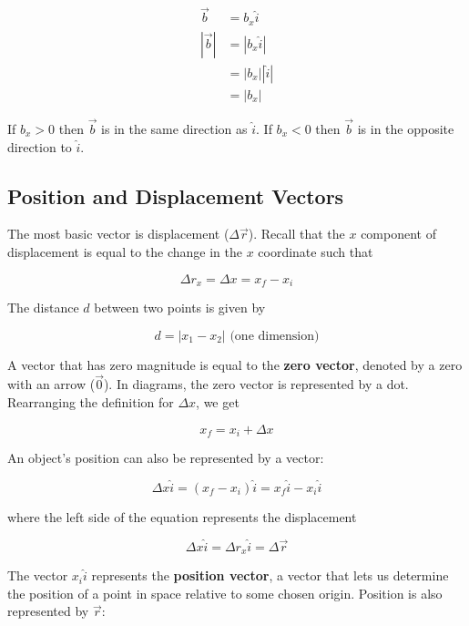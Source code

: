         \begin{align*}
            \overrightarrow{b}      &= b_x \hat{i} \\
            |\overrightarrow{b}|    &= |b_x \hat{i}| \\
                                    &= |b_x||\hat{i}| \\
                                    &= |b_x|
        \end{align*}

        \noindent If $b_x > 0$ then $\overrightarrow{b}$ is in the same direction as $\hat{i}$. If $b_x < 0$ then $\overrightarrow{b}$ is in the opposite direction to $\hat{i}$.



    \subsection{Position and Displacement Vectors}
        The most basic vector is displacement ($\Delta \overrightarrow{r}$). Recall that the $x$ component of displacement is equal to the change in the $x$ coordinate such that

        \[
            \Delta r_x = \Delta x = x_f - x_i
        \]

        \noindent The distance $d$ between two points is given by

        \[
            d = |x_1 - x_2 | \text{ (one dimension)}
        \]

        \noindent A vector that has zero magnitude is equal to the \textbf{zero vector}, denoted by a zero with an arrow ($\overrightarrow{0}$). In diagrams, the zero vector is represented by a dot. Rearranging the
        definition for $\Delta x$, we get

        \[
            x_f = x_i + \Delta x
        \]

        \noinent An object's position can also be represented by a vector:

        \[
            \Delta x \hat{i} = (x_f - x_i)\hat{i} = x_f \hat{i} - x_i \hat{i}
        \]

        \noindent where the left side of the equation represents the displacement

        \[
            \Delta x \hat{i} = \Delta r_x \hat{i} = \Delta \overrightarrow{r}
        \]

        \noindent The vector $x_i \hat{i}$ represents the \textbf{position vector}, a vector that lets us determine the position of a point in space relative to some chosen origin. Position is also represented by
        $\overrightarrow{r}$:

